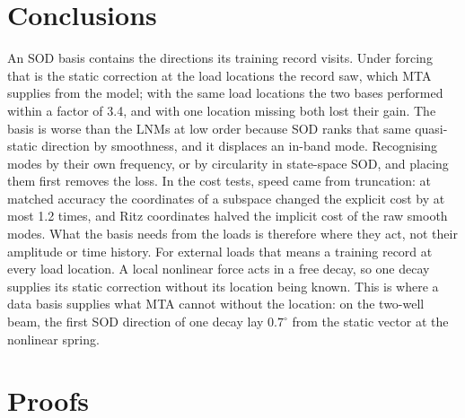 \documentclass[preprint,12pt]{elsarticle}
\begin{document}
\section{Conclusions}\label{sec:concl}
An SOD basis contains the directions its training record visits. Under forcing that is the static correction at the load locations the record saw, which MTA supplies from the model; with the same load locations the two bases performed within a factor of 3.4, and with one location missing both lost their gain. The basis is worse than the LNMs at low order because SOD ranks that same quasi-static direction by smoothness, and it displaces an in-band mode. Recognising modes by their own frequency, or by circularity in state-space SOD, and placing them first removes the loss. In the cost tests, speed came from truncation: at matched accuracy the coordinates of a subspace changed the explicit cost by at most 1.2 times, and Ritz coordinates halved the implicit cost of the raw smooth modes.
What the basis needs from the loads is therefore where they act, not their amplitude or time history. For external loads that means a training record at every load location. A local nonlinear force acts in a free decay, so one decay supplies its static correction without its location being known. This is where a data basis supplies what MTA cannot without the location: on the two-well beam, the first SOD direction of one decay lay $0.7^\circ$ from the static vector at the nonlinear spring.


\appendix
\section{Proofs}\label{app:proofs}
\end{document}
